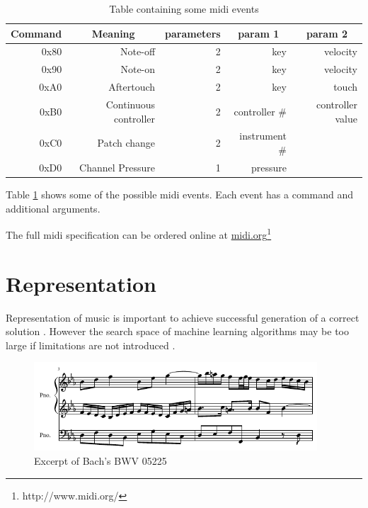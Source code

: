 \begin{table}[htbp]
  \centering
  \caption{Table containing some midi events}
    \begin{tabular}{rrrrr}
    \toprule
    \multicolumn{1}{c}{\textbf{Command}} & \multicolumn{1}{c}{\textbf{Meaning}} & \multicolumn{1}{c}{\textbf{parameters}} & \multicolumn{1}{c}{\textbf{param 1}} & \multicolumn{1}{c}{\textbf{param 2}} \\
    \midrule
    0x80  & Note-off & 2     & key   & velocity \\
    0x90  & Note-on & 2     & key   & velocity \\
    0xA0  & Aftertouch & 2     & key   & touch \\
    0xB0  & Continuous controller & 2     & controller \# & controller value \\
    0xC0  & Patch change & 2     & instrument \# &  \\
    0xD0  & Channel Pressure & 1     & pressure &  \\
    \bottomrule
    \end{tabular}%
  \label{tab:midievents}%
\end{table}%

Table \ref{tab:midievents} shows some of the possible midi events. Each event has a command and additional arguments.

The full midi specification can be ordered online at \href{http://www.midi.org/}{midi.org}\footnote{http://www.midi.org/}


\section{Representation}
Representation of music is important to achieve successful generation of a correct solution \cite{gibson1991neurogen}. However the search space of machine learning algorithms may be too large if limitations are not introduced \cite{Jacob1995}. 

\begin{figure}
\centerline{\includegraphics[width=400px]{../images/bwv05225_excerpt.pdf}}
\caption{Excerpt of Bach's BWV 05225}
\label{ims:be05225}
\end{figure}


